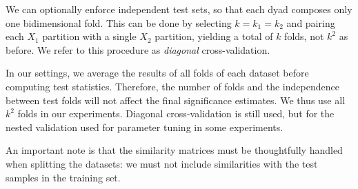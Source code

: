 


We can optionally enforce independent test sets, so that each dyad composes only one bidimensional fold. This can be done by selecting $k=k_1=k_2$ and pairing each $X_1$ partition with a single $X_2$ partition, yielding a total of $k$ folds, not $k^2$ as before.
We refer to this procedure as \emph{diagonal} cross-validation.

In our settings, we average the results of all folds of each dataset before computing test statistics. Therefore, the number of folds and the independence between test folds will not affect the final significance estimates. We thus use all $k^2$ folds in our experiments. Diagonal cross-validation is still used, but for the nested validation used for parameter tuning in some experiments.

An important note is that the similarity matrices must be thoughtfully handled when splitting the datasets: we must not include similarities with the test samples in the training set.  %

